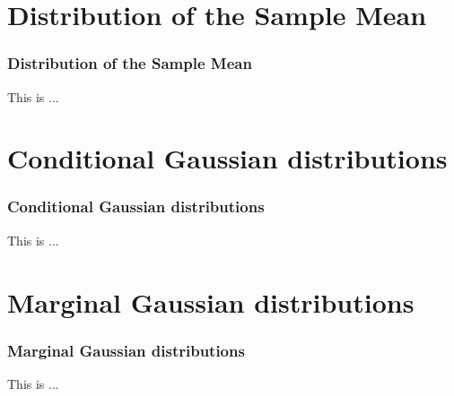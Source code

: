 \documentclass{beamer}
\begin{document}
\section{Distribution of the Sample Mean}
\begin{frame}
\frametitle{Distribution of the Sample Mean}
This is ...
\end{frame}

\section{Conditional Gaussian distributions }
\begin{frame}
\frametitle{Conditional Gaussian distributions}
This is ...
\end{frame}
\section{Marginal Gaussian distributions }
\begin{frame}
\frametitle{Marginal Gaussian distributions}
This is ...
\end{frame}
\end{document}
